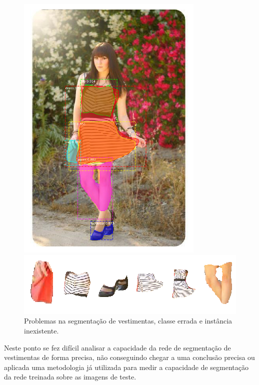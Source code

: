 \documentclass[12pt]{report}
\begin{document}
\begin{figure}
\begin{minipage}[b]{0.48\textwidth}
    \includegraphics[width=0.8\textwidth]{images/resultados/490842roupas.png}
  \end{minipage}
    \hfill
  \begin{minipage}[b]{0.7\textwidth}
    \includegraphics[width=\textwidth]{images/resultados/2.png}
  \end{minipage}
  \caption{Problemas na segmentação de vestimentas, classe errada e instância inexistente.}
  \label{fig:moda-seg2}
\end{figure}

Neste ponto se fez difícil analisar a capacidade da rede de segmentação de vestimentas de forma precisa, não conseguindo chegar a uma conclusão precisa ou aplicada uma metodologia já utilizada para medir a capacidade de segmentação da rede treinada sobre as imagens de teste. 
\end{document}

